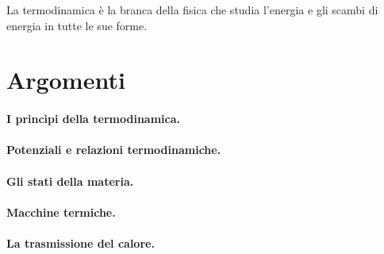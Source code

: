 
\begin{definition}[Termodinamica] La termodinamica è la branca della fisica che studia l'energia e gli scambi di energia in tutte le sue forme.
\end{definition}

\section*{Argomenti}
\paragraph{I principi della termodinamica.}
\paragraph{Potenziali e relazioni termodinamiche.}
\paragraph{Gli stati della materia.}
\paragraph{Macchine termiche.}
\paragraph{La trasmissione del calore.}

